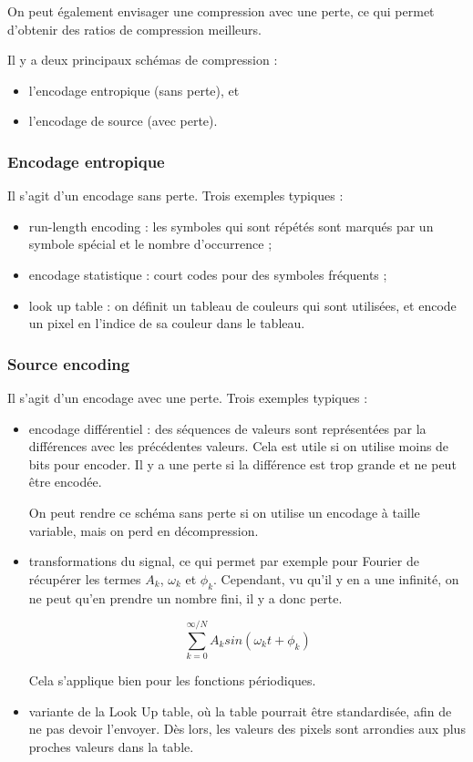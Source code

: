 \documentclass[10pt,a4paper]{report}
\begin{document}
		On peut également envisager une compression avec une perte, ce qui permet d'obtenir des ratios de compression meilleurs.
		
		Il y a deux principaux schémas de compression :
		
		\begin{itemize}
			\item l'encodage entropique (sans perte), et
			\item l'encodage de source (avec perte).
		\end{itemize}
		
		\subsubsection{Encodage entropique}
		
		Il s'agit d'un encodage sans perte. Trois exemples typiques :
		
		\begin{itemize}
			\item run-length encoding : les symboles qui sont répétés sont marqués par un symbole spécial et le nombre d'occurrence ;
			\item encodage statistique : court codes pour des symboles fréquents ;
			\item look up table : on définit un tableau de couleurs qui sont utilisées, et encode un pixel en l'indice de sa couleur dans le tableau.
		\end{itemize}
		
		\subsubsection{Source encoding}
		
		Il s'agit d'un encodage avec une perte. Trois exemples typiques :
		
		\begin{itemize}
			\item encodage différentiel : des séquences de valeurs sont représentées par la différences avec les précédentes valeurs. Cela est utile si on utilise moins de bits pour encoder. Il y a une perte si la différence est trop grande et ne peut être encodée.
			
			On peut rendre ce schéma sans perte si on utilise un encodage à taille variable, mais on perd en décompression.
			
			\item transformations du signal, ce qui permet par exemple pour Fourier de récupérer les termes $A_k$, $\omega_k$ et $\phi_k$. Cependant, vu qu'il y en a une infinité, on ne peut qu'en prendre un nombre fini, il y a donc perte.
			
			$$\sum_{k = 0}^{\infty / N} A_k sin(\omega_kt + \phi_k)$$
			
			Cela s'applique bien pour les fonctions périodiques.
			
			\item variante de la Look Up table, où la table pourrait être standardisée, afin de ne pas devoir l'envoyer. Dès lors, les valeurs des pixels sont arrondies aux plus proches valeurs dans la table.
		\end{itemize}
		
\end{document}
